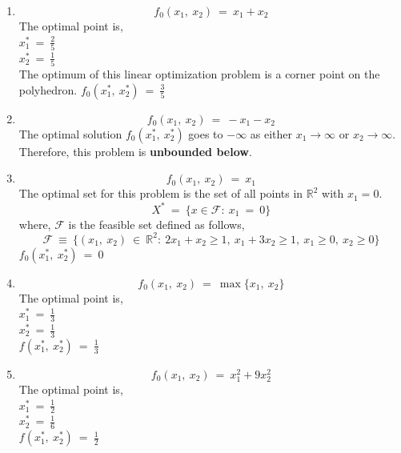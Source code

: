 \documentclass[12pt, draftcls, onecolumn]{IEEEtran}
\begin{document}
\begin{enumerate}
    \item \[f_0(x_1,\ x_2)\ =\ x_1 + x_2\]
    The optimal point is,
    \\$x_1^*\ =\ \frac{2}{5}$
    \\$x_2^*\ =\ \frac{1}{5}$
    \\The optimum of this linear optimization problem is a corner point on the polyhedron.
    $f_0(x_1^*,\ x_2^*)\ =\ \frac{3}{5}$
    \item \[f_0(x_1,\ x_2)\ =\ -x_1 - x_2\]
    The optimal solution $f_0(x_1^*,\ x_2^*)$ goes to $-\infty$ as either $x_1 \rightarrow \infty$ or $x_2 \rightarrow \infty$.
    \\Therefore, this problem is \textbf{unbounded below}.
    \item \[f_0(x_1,\ x_2)\ =\ x_1\]
    The optimal set for this problem is the set of all points in $\mathbb{R}^2$ with $x_1 = 0$.
    \[X^*\ =\ \{x \in \mathcal{F}:\ x_1\ =\ 0\}\]
    where, $\mathcal{F}$ is the feasible set defined as follows,
    \[\mathcal{F}\ \equiv\ \{(x_1,\ x_2)\ \in\ \mathbb{R}^2:\ 2x_1 + x_2 \geq 1,\ x_1 + 3x_2 \geq 1,\ x_1 \geq 0,\ x_2 \geq 0\}\]
    $f_0(x_1^*,\ x_2^*)\ =\ 0$
    \item \[f_0(x_1,\ x_2)\ =\ \max\{x_1,\ x_2\}\]
    The optimal point is,
    \\$x_1^*\ =\ \frac{1}{3}$
    \\$x_2^*\ =\ \frac{1}{3}$
    \\$f(x_1^*,\ x_2^*)\ =\ \frac{1}{3}$
    \item \[f_0(x_1,\ x_2)\ =\ x_1^2 + 9x_2^2\]
    The optimal point is,
    \\$x_1^*\ =\ \frac{1}{2}$
    \\$x_2^*\ =\ \frac{1}{6}$
    \\$f(x_1^*,\ x_2^*)\ =\ \frac{1}{2}$
\end{enumerate}
\end{document}
